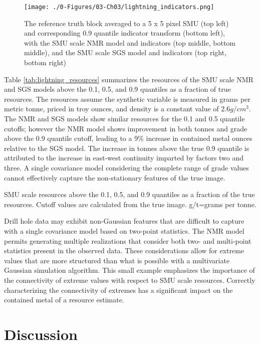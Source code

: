 \begin{figure}[htb!]
    \centering
    \texttt{[image: ./0-Figures/03-Ch03/lightning\_indicators.png]}
    \caption{The reference truth block averaged to a 5 x 5 pixel \gls{SMU} (top left) and corresponding 0.9 quantile indicator transform (bottom left), with the \gls{SMU} scale \gls{NMR} model and indicators (top middle, bottom middle), and the \gls{SMU} scale \gls{SGS} model and indicators (top right, bottom right)}
    \label{fig:lightning_indicators}
\end{figure}

Table \ref{tab:lightning_resources} summarizes the resources of the \gls{SMU} scale \gls{NMR} and \gls{SGS} models above the 0.1, 0.5, and 0.9 quantiles as a fraction of true resources. The resources assume the synthetic variable is measured in grams per metric tonne, priced in troy ounces, and density is a constant value of $2.6 g/cm^{3}$. The \gls{NMR} and \gls{SGS} models show similar resources for the 0.1 and 0.5 quantile cutoffs; however the  \gls{NMR} model shows improvement in both tonnes and grade above the 0.9 quantile cutoff, leading to a 9\% increase in contained metal ounces relative to the \gls{SGS} model. The increase in tonnes above the true 0.9 quantile is attributed to the increase in east-west continuity imparted by factors two and three. A single covariance model considering the complete range of grade values cannot effectively capture the non-stationary features of the true image.

\begin{table}[!htb]
    \centering
    \caption{\Gls{SMU} scale resources above the 0.1, 0.5, and 0.9 quantiles as a fraction of the true resources. Cutoff values are calculated from the true image. g/t=grams per tonne.}
    \resizebox{1\width}{!}{}
    \label{tab:lightning_resources}
\end{table}

Drill hole data may exhibit non-Gaussian features that are difficult to capture with a single covariance model based on two-point statistics. The \gls{NMR} model permits generating multiple realizations that consider both two- and multi-point statistics present in the observed data. These considerations allow for extreme values that are more structured than what is possible with a multivariate Gaussian simulation algorithm. This small example emphasizes the importance of the connectivity of extreme values with respect to \gls{SMU} scale resources. Correctly characterizing the connectivity of extremes has a significant impact on the contained metal of a resource estimate.

\FloatBarrier
\section{Discussion}
\label{sec:03discuss}